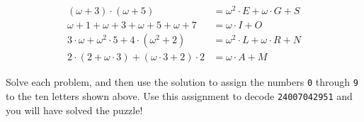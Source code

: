 \begin{align*}
  (\omega+3)\cdot(\omega+5)&=\omega^2\cdot E+\omega\cdot G+S \\
  \omega+1+\omega+3+\omega+5+\omega+7&=\omega\cdot I+O \\
  3\cdot\omega+\omega^2\cdot 5+4\cdot(\omega^2+2)&=
        \omega^2\cdot L+\omega\cdot R+N \\
  2\cdot(2+\omega\cdot3)+(\omega\cdot3+2)\cdot2&=
        \omega\cdot A+M
\end{align*}

Solve each problem, and then use the solution to assign the numbers \texttt{0}
through \texttt{9} to the ten letters shown above. Use this assignment
to decode \texttt{24007042951} and you will have solved the puzzle!


